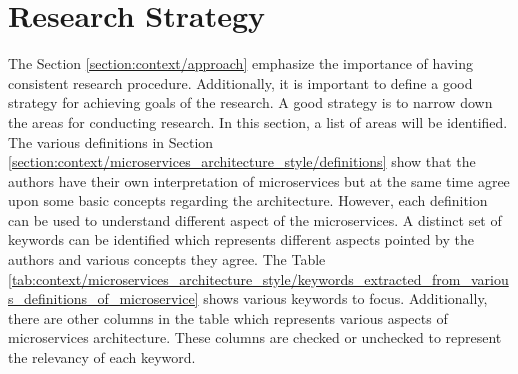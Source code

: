 \section{Research Strategy}\label{section:context/research_strategy}
The Section \ref{section:context/approach} emphasize the importance of having consistent research procedure. Additionally, it is important to define a good strategy for achieving goals of the research. A good strategy is to narrow down the areas for conducting research. In this section, a list of areas will be identified.\\
The various definitions in Section \ref{section:context/microservices_architecture_style/definitions} show that the authors have their own interpretation of microservices but at the same time agree upon some basic concepts regarding the architecture. However, each definition can be used to understand different aspect of the microservices. A distinct set of keywords can be identified which represents different aspects pointed by the authors and various concepts they agree. The Table \ref{tab:context/microservices_architecture_style/keywords_extracted_from_various_definitions_of_microservice} shows various keywords to focus. Additionally, there are other columns in the table which represents various aspects of microservices architecture. These columns are checked or unchecked to represent the relevancy of each keyword. 

